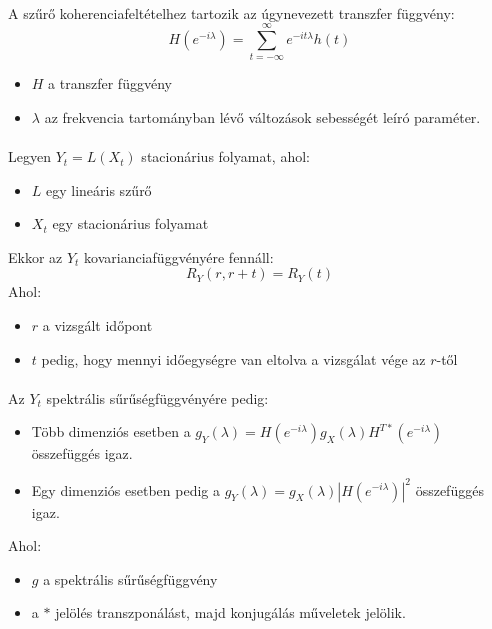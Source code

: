 \documentclass[11pt,a4paper]{article}
\begin{document}
					\paragraph{}
						A szűrő koherenciafeltételhez tartozik az úgynevezett transzfer függvény:
						$$H \left(e^{-i \lambda} \right) = \sum_{t = -\infty}^{\infty} e^{-i t \lambda} h(t)$$
						\begin{itemize}
						    \item $H$ a transzfer függvény
						    \item $\lambda$ az frekvencia tartományban lévő változások sebességét leíró paraméter.
						\end{itemize}
					\paragraph{}
						Legyen $Y_t = L(X_t)$ stacionárius folyamat, ahol:
						\begin{itemize}
						    \item $L$ egy lineáris szűrő
						    \item $X_t$ egy stacionárius folyamat
						\end{itemize}
						
						Ekkor az $Y_t$ kovarianciafüggvényére fennáll:
						$$R_Y(r,r+t) = R_Y(t)$$
						Ahol:
						\begin{itemize}
						    \item $r$ a vizsgált időpont
						    \item $t$ pedig, hogy mennyi időegységre van eltolva a vizsgálat vége az $r$-től
						\end{itemize}
					\paragraph{}
						Az $Y_t$ spektrális sűrűségfüggvényére pedig:
						\begin{itemize}
						    \item Több dimenziós esetben a $g_Y(\lambda) = H\left(e^{-i \lambda} \right)g_X(\lambda)H^{T*}\left(e^{-i \lambda} \right)$ összefüggés igaz.
						    \item Egy dimenziós esetben pedig a $g_Y(\lambda) = g_X(\lambda)\left|H\left(e^{-i \lambda} \right)\right|^2$ összefüggés igaz.
						\end{itemize}
						Ahol:
						\begin{itemize}
						    \item $g$ a spektrális sűrűségfüggvény
						    \item a $*$ jelölés transzponálást, majd konjugálás műveletek jelölik.
						\end{itemize}
\end{document}
